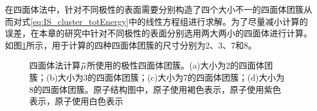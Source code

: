 在四面体法中，针对不同极性的表面需要分别构造了四个大小不一的四面体团簇从而对式\eqref{eq:IS_cluster_totEnergy}中的线性方程组进行求解。为了尽量减小计算的误差，在本章的研究中针对不同极性的表面分别选用两大两小的四面体进行计算。如图\ref{fig:IS_structure_cluster}所示，用于计算的四种四面体团簇的尺寸分别为2、3、7和8。

\begin{figure}[!b]
\end{figure}
\begin{figure}\ContinuedFloat        
    \caption{四面体法计算$\it \widetilde{\mu}_{\rm }^{\rm } \it$所使用的极性四面体团簇。(a)大小为2的四面体团簇；(b)大小为3的四面体团簇；(c)大小为7的四面体团簇；(d)大小为8的四面体团簇。原子结构图中，原子使用褐色表示，原子使用紫色表示，原子使用白色表示}
    \label{fig:IS_structure_cluster}
\end{figure}

